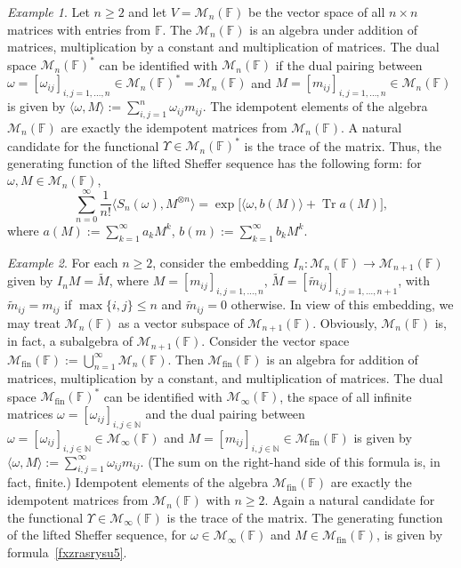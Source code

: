 \documentclass[12pt]{article}
\theoremstyle{remark}
\theoremstyle{remark}
\newtheorem{example}{Example}
\theoremstyle{remark}
\begin{document}
\begin{example}Let $n\geq2$ and let $V=\mathcal M_n(\mathbb F)$ be the vector space of all $n\times n$ matrices with entries from
  $\mathbb F$.  The $\mathcal M_n(\mathbb F)$ is an algebra under addition of matrices, multiplication by a constant and multiplication of matrices. The dual space $\mathcal M_n(\mathbb F)^*$  can be identified with $\mathcal M_n(\mathbb F)$ if the dual pairing between $\omega=[\omega_{ij}]_{i,j=1,\dots,n}\in \mathcal M_n(\mathbb F)^*=\mathcal M_n(\mathbb F)$ and $M=[m_{ij}]_{i,j=1,\dots,n}\in\mathcal M_n(\mathbb F)$ is given by 
$\langle \omega,M\rangle:=\sum_{i,j=1}^n \omega_{ij}m_{ij}$. 
The idempotent elements of the algebra $\mathcal M_n(\mathbb F)$ are exactly the idempotent matrices from $\mathcal M_n(\mathbb F)$. A natural candidate for the functional $\Upsilon\in \mathcal M_n(\mathbb F)^*$ is the trace of the matrix. Thus, the generating function of the lifted Sheffer sequence has the following form: for $\omega,M\in \mathcal M_n(\mathbb F)$,
\begin{equation}\label{fxzrasrysu5}
\sum_{n=0}^\infty\frac1{n!}\langle S_n(\omega),M^{\otimes n}\rangle=\exp\big[\langle\omega,b(M)\rangle+\operatorname{Tr}a(M)\big],
\end{equation} 
where $a(M):=\sum_{k=1}^\infty a_kM^k$, $b(m):=\sum_{k=1}^\infty b_kM^k$. 
\end{example}


\begin{example}\label{hish9wss9ss9}
For each $n\geq2$, consider the embedding $I_n:\mathcal M_n(\mathbb F)\to \mathcal M_{n+1}(\mathbb F)$ given by $I_nM=\widetilde M$, where $M=[m_{ij}]_{i,j=1,\dots,n}$, $\widetilde M=[\tilde m_{ij}]_{i,j=1,\dots,n+1}$, with $\tilde m_{ij}=m_{ij}$ if $\max\{i,j\}\leq n$ and $\tilde m_{ij}=0$ otherwise. In view of this embedding, we may treat $\mathcal M_n(\mathbb F)$ as a vector subspace of $\mathcal M_{n+1}(\mathbb F)$. Obviously, $\mathcal M_n(\mathbb F)$ is, in fact, a subalgebra of $\mathcal M_{n+1}(\mathbb F)$. Consider the vector space  $\mathcal M_{\mathrm{fin}}(\mathbb F):=\bigcup_{n=1}^\infty \mathcal M_n(\mathbb F)$. Then $\mathcal M_{\mathrm{fin}}(\mathbb F)$ is an  algebra for addition of matrices, multiplication by a constant, and multiplication of matrices. The dual space $\mathcal M_{\mathrm{fin}}(\mathbb F)^*$ can be identified with $\mathcal M_\infty(\mathbb F)$, the space of all infinite matrices $\omega=[\omega_{ij}]_{i,j\in\mathbb N}$ and the dual pairing between $\omega=[\omega_{ij}]_{i,j\in\mathbb N}\in \mathcal M_\infty(\mathbb F)$ and $M=[m_{ij}]_{i,j\in\mathbb N}\in\mathcal M_{\mathrm{fin}}(\mathbb F)$ is given by $\langle\omega,M\rangle:=\sum_{i,j=1}^\infty \omega_{ij}m_{ij}$. (The sum on the right-hand side of this formula is, in fact, finite.)
Idempotent elements of the algebra  $\mathcal M_{\mathrm{fin}}(\mathbb F)$ are exactly the idempotent matrices from $\mathcal M_n(\mathbb F)$ with $n\geq 2$. Again a natural candidate for the functional $\Upsilon\in \mathcal M_\infty(\mathbb F)$ is  the trace of the matrix. The generating function of the lifted Sheffer sequence, for $\omega\in \mathcal M_\infty(\mathbb F)$ and $M\in \mathcal M_{\mathrm{fin}}(\mathbb F)$, is given by formula~\eqref{fxzrasrysu5}.  \end{example}
\end{document}
